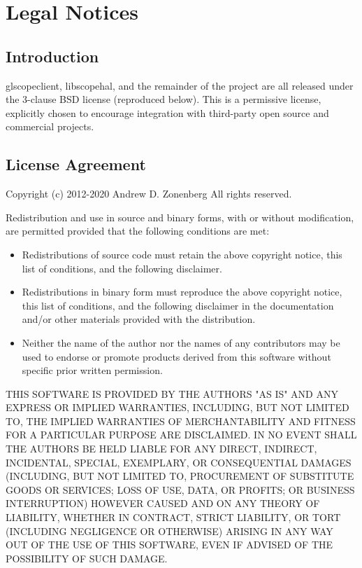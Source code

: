 \section{Legal Notices}

\subsection{Introduction}

glscopeclient, libscopehal, and the remainder of the project are all released under the 3-clause BSD license
(reproduced below). This is a permissive license, explicitly chosen to encourage integration with third-party open
source and commercial projects.

\subsection{License Agreement}

Copyright (c) 2012-2020 Andrew D. Zonenberg
All rights reserved.

Redistribution and use in source and binary forms, with or without modification, are permitted provided that the
following conditions are met:
\begin{itemize}
\item Redistributions of source code must retain the above copyright notice, this list of conditions, and the
following disclaimer.
\item Redistributions in binary form must reproduce the above copyright notice, this list of conditions, and the
following disclaimer in the documentation and/or other materials provided with the distribution.
\item Neither the name of the author nor the names of any contributors may be used to endorse or promote products
derived from this software without specific prior written permission.
\end{itemize}

THIS SOFTWARE IS PROVIDED BY THE AUTHORS "AS IS" AND ANY EXPRESS OR IMPLIED WARRANTIES, INCLUDING, BUT NOT LIMITED
TO, THE IMPLIED WARRANTIES OF MERCHANTABILITY AND FITNESS FOR A PARTICULAR PURPOSE ARE DISCLAIMED. IN NO EVENT SHALL
THE AUTHORS BE HELD LIABLE FOR ANY DIRECT, INDIRECT, INCIDENTAL, SPECIAL, EXEMPLARY, OR CONSEQUENTIAL DAMAGES
(INCLUDING, BUT NOT LIMITED TO, PROCUREMENT OF SUBSTITUTE GOODS OR SERVICES; LOSS OF USE, DATA, OR PROFITS; OR
BUSINESS INTERRUPTION) HOWEVER CAUSED AND ON ANY THEORY OF LIABILITY, WHETHER IN CONTRACT, STRICT LIABILITY, OR TORT
(INCLUDING NEGLIGENCE OR OTHERWISE) ARISING IN ANY WAY OUT OF THE USE OF THIS SOFTWARE, EVEN IF ADVISED OF THE
POSSIBILITY OF SUCH DAMAGE.

